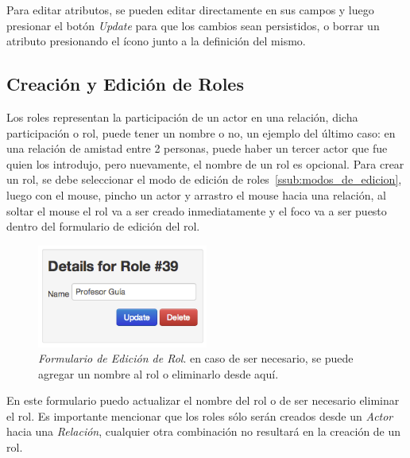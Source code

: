 Para editar atributos, se pueden editar directamente en sus campos y luego presionar el botón \emph{Update} para que los cambios sean persistidos, o borrar un atributo presionando el ícono junto a la definición del mismo.


\subsection{Creación y Edición de Roles} %
\label{sub:creacion_y_edicion_de_roles}

Los roles representan la participación de un actor en una relación, dicha participación o rol, puede tener un nombre o no, un ejemplo del último caso: en una relación de amistad entre 2 personas, puede haber un tercer actor que fue quien los introdujo, pero nuevamente, el nombre de un rol es opcional. Para crear un rol, se debe seleccionar el modo de edición de roles~\ref{ssub:modos_de_edicion}, luego con el mouse, pincho un actor y arrastro el mouse hacia una relación, al soltar el mouse el rol va a ser creado inmediatamente y el foco va a ser puesto dentro del formulario de edición del rol.

\begin{figure}[H]
  \centering
  \includegraphics[width=0.5\textwidth]{images/edicion_rol.png}
  \caption[Formulario de Edición de Rol]{\emph{Formulario de Edición de Rol}. en caso de ser necesario, se puede agregar un nombre al rol o eliminarlo desde aquí.}
  \label{edicion_rol}
\end{figure}

En este formulario puedo actualizar el nombre del rol o de ser necesario eliminar el rol. Es importante mencionar que los roles sólo serán creados desde un \emph{Actor} hacia una \emph{Relación}, cualquier otra combinación no resultará en la creación de un rol.



